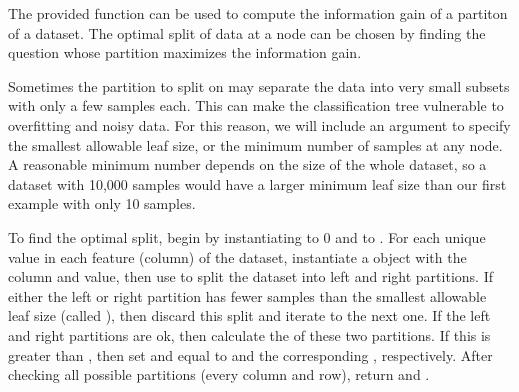 The provided function  can be used to compute the information gain of a partiton of a dataset.
The optimal split of data at a node can be chosen by finding the question whose partition maximizes the information gain.

Sometimes the partition to split on may separate the data into very small subsets with only a few samples each.
This can make the classification tree vulnerable to overfitting and noisy data.
For this reason, we will include an argument to specify the smallest allowable leaf size, or the minimum number of samples at any node.
A reasonable minimum number depends on the size of the whole dataset, so a dataset with 10,000 samples would have a larger minimum leaf size than our first example with only 10 samples.

To find the optimal split, begin by instantiating  to 0 and  to .
For each unique value in each feature (column) of the dataset, instantiate a  object with the column and value, then use  to split the dataset into left and right partitions.
If either the left or right partition has fewer samples than the smallest allowable leaf size (called \mbox{),} then discard this split and iterate to the next one.
If the left and right partitions are ok, then calculate the  of these two partitions.
If this  is greater than , then set  and  equal to  and the corresponding , respectively.
After checking all possible partitions (every column and row), return  and .

